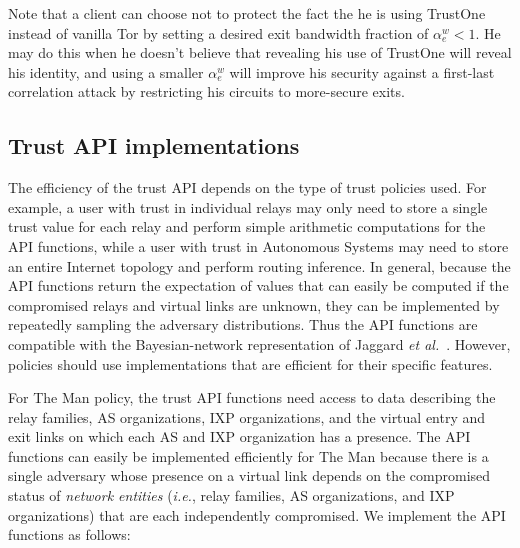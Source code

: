 \documentclass[conference]{styles/IEEEtran}
\newcommand{\etal}{\emph{et al.}}
\newcommand{\ie}{\emph{i.e.}}
\begin{document}
Note that a client can choose not to protect the fact the he is using TrustOne instead of vanilla
Tor by setting a desired exit bandwidth fraction of $\alpha^w_e < 1$. He may do this when he
doesn't believe that revealing his use of TrustOne will reveal his identity, and using a smaller
$\alpha^w_e$ will improve his security against a first-last correlation attack by restricting
his circuits to more-secure exits.

\subsection{Trust API implementations} \label{subsec:algorithm:api_imp}
The efficiency of the trust API depends on the type of trust policies
used. For example, a user with trust in individual relays may only need to store a single
trust value for each relay and perform simple arithmetic computations for the API functions, while a
user with trust in Autonomous Systems may need to store an entire Internet topology and perform
routing inference. In general, because the API functions return the expectation of values that can
easily be computed if the compromised relays and virtual links are unknown, they can be implemented
by repeatedly sampling the adversary distributions. Thus the API functions are compatible with the
Bayesian-network representation of Jaggard \etal~\cite{trustrep-popets14}. However,
policies should use implementations that are efficient for their specific features. 

For \textsf{The Man} policy, the trust API functions need access to data describing the relay
families, AS organizations, IXP organizations, and the virtual entry and exit links on which each AS
and IXP organization has a presence. The API functions can easily be implemented efficiently for
\textsf{The Man} because there is a single adversary whose presence on a virtual link depends on the
compromised status of \textit{network entities} (\ie{}, relay families, AS organizations, and IXP
organizations) that are each independently compromised. We implement the API functions as follows:
\end{document}

